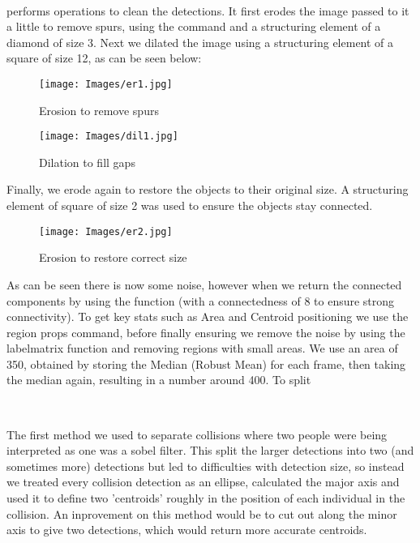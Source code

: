 \documentclass{article}
\begin{document}
\

 
  performs operations to clean the detections. It first erodes the image passed to it a little to remove spurs, using the  command and a structuring element of a diamond of size 3. Next we dilated the image using a structuring element of a square of size 12, as can be seen below:
 
\begin{figure}[h]
    \centering
    \texttt{[image: Images/er1.jpg]} 
    \caption[b]{Erosion to remove spurs}
\end{figure}
 
\begin{figure}[h]
    \centering
    \texttt{[image: Images/dil1.jpg]} 
    \caption[b]{Dilation to fill gaps}
\end{figure}

Finally, we erode again to restore the objects to their original size. A structuring element of square of size 2 was used to ensure the objects stay connected.

\begin{figure}[h]
    \centering
    \texttt{[image: Images/er2.jpg]} 
    \caption[b]{Erosion to restore correct size}
\end{figure}


As can be seen there is now some noise, however when we return the connected components by using the  function (with a connectedness of 8 to ensure strong connectivity). To get key stats such as Area and Centroid positioning we use the region props command, before finally ensuring we remove the noise by using the labelmatrix function and removing regions with small areas. We use an area of 350, obtained by storing the Median (Robust Mean) for each frame, then taking the median again, resulting in a number around 400. To split 

\

The first method we used to separate collisions where two people were being interpreted as one was a sobel filter. This split the larger detections into two (and sometimes more) detections but led to difficulties with detection size, so instead we treated every collision detection as an ellipse, calculated the major axis and used it to define two 'centroids' roughly in the position of each individual in the collision. An inprovement on this method would be to cut out along the minor axis to give two detections, which would return more accurate centroids.
\end{document}
